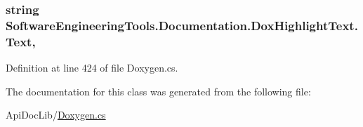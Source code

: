 \hypertarget{class_software_engineering_tools_1_1_documentation_1_1_dox_highlight_text_ad242ac8b899f16d9562e4b3cf0d4ae89}{
\subsubsection[{Text}]{\setlength{\rightskip}{0pt plus 5cm}string Software\+Engineering\+Tools.\+Documentation.\+Dox\+Highlight\+Text.\+Text\hspace{0.3cm}{\ttfamily [get]}, {\ttfamily [set]}}}\label{class_software_engineering_tools_1_1_documentation_1_1_dox_highlight_text_ad242ac8b899f16d9562e4b3cf0d4ae89}


Definition at line 424 of file Doxygen.\+cs.



The documentation for this class was generated from the following file\+:\begin{DoxyCompactItemize}
\item 
Api\+Doc\+Lib/\hyperlink{_doxygen_8cs}{Doxygen.\+cs}\end{DoxyCompactItemize}

